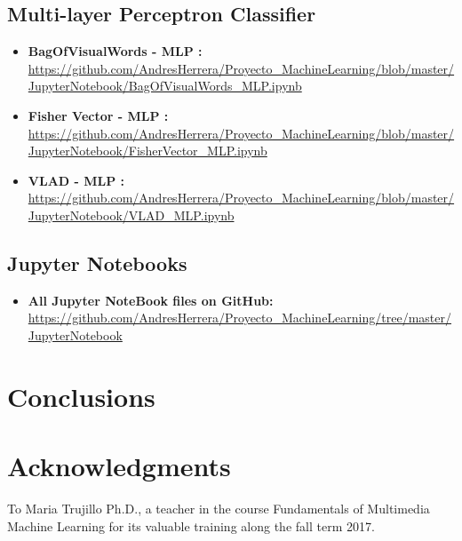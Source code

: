 \documentclass[12pt]{article}
\numberwithin{equation}{section}
\numberwithin{table}{section}
\numberwithin{figure}{section}
\begin{document}
\subsection{Multi-layer Perceptron Classifier }

\begin{itemize}
	\item {\textbf{BagOfVisualWords - MLP :} } \url{https://github.com/AndresHerrera/Proyecto_MachineLearning/blob/master/JupyterNotebook/BagOfVisualWords_MLP.ipynb}
	
	\item {\textbf{Fisher Vector - MLP :} } \url{	https://github.com/AndresHerrera/Proyecto_MachineLearning/blob/master/JupyterNotebook/FisherVector_MLP.ipynb}
	
	\item {\textbf{VLAD - MLP :} } \url{	https://github.com/AndresHerrera/Proyecto_MachineLearning/blob/master/JupyterNotebook/VLAD_MLP.ipynb}
	
\end{itemize}






\subsection{Jupyter Notebooks}
\begin{itemize}
	\item {\textbf{All Jupyter NoteBook files on GitHub:} } \url{https://github.com/AndresHerrera/Proyecto_MachineLearning/tree/master/JupyterNotebook} 
\end{itemize}

	
	
	





\section{Conclusions}








\section*{Acknowledgments}

To Maria Trujillo Ph.D., a teacher in the course Fundamentals of Multimedia Machine Learning for its valuable training along the fall term 2017.
 



\end{document}
